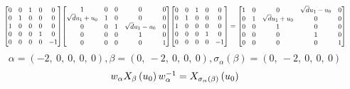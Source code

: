 \documentclass[11pt]{article}
\theoremstyle{definition}
\begin{document}
\[
\scaletoalign{\textwidth}{{\left[\begin{matrix}0 & 0 & 1 & 0 & 0\\0 & 1 & 0 & 0 & 0\\1 & 0 & 0 & 0 & 0\\0 & 0 & 0 & 1 & 0\\0 & 0 & 0 & 0 & -1\end{matrix}\right]} {\left[\begin{matrix}1 & 0 & 0 & 0 & 0\\\sqrt{d} u_{1} + u_{0} & 1 & 0 & 0 & 0\\0 & 0 & 1 & \sqrt{d} u_{1} - u_{0} & 0\\0 & 0 & 0 & 1 & 0\\0 & 0 & 0 & 0 & 1\end{matrix}\right]} {\left[\begin{matrix}0 & 0 & 1 & 0 & 0\\0 & 1 & 0 & 0 & 0\\1 & 0 & 0 & 0 & 0\\0 & 0 & 0 & 1 & 0\\0 & 0 & 0 & 0 & -1\end{matrix}\right]} = {\left[\begin{matrix}1 & 0 & 0 & \sqrt{d} u_{1} - u_{0} & 0\\0 & 1 & \sqrt{d} u_{1} + u_{0} & 0 & 0\\0 & 0 & 1 & 0 & 0\\0 & 0 & 0 & 1 & 0\\0 & 0 & 0 & 0 & 1\end{matrix}\right]}}
\]
\[
\alpha = \left( -2, \  0, \  0, \  0, \  0\right), \beta = \left( 0, \  -2, \  0, \  0, \  0\right), \sigma_{\alpha}(\beta) = \left( 0, \  -2, \  0, \  0, \  0\right)
\]
\[
\scaletoalign{\textwidth}{w_{\alpha} X_{\beta}\left(u_{0}\right) w_{\alpha}^{-1} = X_{\sigma_{\alpha}\left(\beta\right)}\left(u_{0}\right)}
\]
\end{document}
